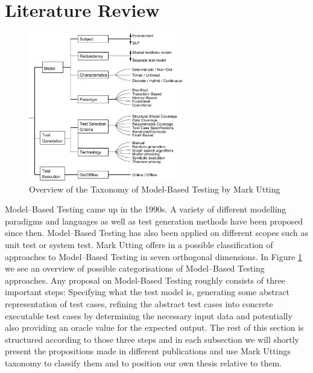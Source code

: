 \section{Literature Review}
\label{sec:RelatedWork}
\begin{figure}
\begin{center}
\includegraphics[width=0.6\textwidth]{./pics/taxonomyOfMBT.pdf}
\end{center}
\caption{Overview of the Taxonomy of Model-Based Testing by Mark Utting \cite{utting2006taxonomy}}
\label{fig:UttingTaxonomy}
\end{figure}
Model--Based Testing came up in the 1990s. A variety of different modelling paradigms and languages as well as test generation methods have been proposed since then. Model--Based Testing has also been applied on different scopes such as unit test or system test. Mark Utting offers in \cite{utting2006taxonomy} a possible classification of approaches to Model--Based Testing in seven orthogonal dimensions. In Figure \ref{fig:UttingTaxonomy} we see an overview of possible categorisations of Model--Based Testing approaches. Any proposal on Model-Based Testing roughly consists of three important steps: Specifying what the test model is, generating some abstract representation of test cases, refining the abstract test cases into concrete executable test cases by determining the necessary input data and potentially also providing an oracle value for the expected output. The rest of this section is structured according to those three steps and in each subsection we will shortly present the propositions made in different publications and use Mark Uttings taxonomy to classify them and to position our own thesis relative to them.
% 

